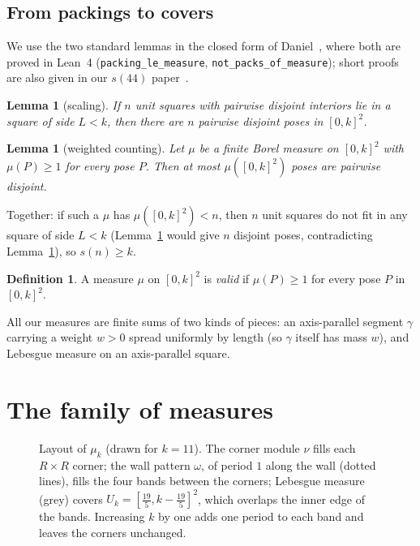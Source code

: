 \documentclass[11pt]{amsart}
\newtheorem{lemma}[theorem]{Lemma}
\theoremstyle{definition}
\newtheorem{definition}[theorem]{Definition}
\theoremstyle{remark}
\begin{document}
\subsection*{From packings to covers}
We use the two standard lemmas in the closed form of Daniel~\cite{daniel}, where both are proved in Lean~4
(\texttt{packing\_le\_measure}, \texttt{not\_packs\_of\_measure}); short proofs are also given in our $s(44)$
paper~\cite{s44}.

\begin{lemma}[scaling]\label{lem:scale}
If $n$ unit squares with pairwise disjoint interiors lie in a square of side $L<k$, then there are $n$ pairwise
disjoint poses in $[0,k]^2$.
\end{lemma}

\begin{lemma}[weighted counting]\label{lem:count}
Let $\mu$ be a finite Borel measure on $[0,k]^2$ with $\mu(P)\ge1$ for every pose $P$. Then at most $\mu([0,k]^2)$
poses are pairwise disjoint.
\end{lemma}

\noindent Together: if such a $\mu$ has $\mu([0,k]^2)<n$, then $n$ unit squares do not fit in any square of side
$L<k$ (Lemma~\ref{lem:scale} would give $n$ disjoint poses, contradicting Lemma~\ref{lem:count}), so $s(n)\ge k$.

\begin{definition}
A measure $\mu$ on $[0,k]^2$ is \emph{valid} if $\mu(P)\ge1$ for every pose $P$ in $[0,k]^2$.
\end{definition}

All our measures are finite sums of two kinds of pieces: an axis-parallel segment $\gamma$ carrying a weight
$w>0$ spread uniformly by length (so $\gamma$ itself has mass $w$), and Lebesgue measure on an axis-parallel square.

\section{The family of measures}\label{sec:family}

\begin{figure}[ht]
\centering
\caption{Layout of $\mu_k$ (drawn for $k=11$). The corner module $\nu$ fills each $R\times R$ corner; the wall
pattern $\omega$, of period $1$ along the wall (dotted lines), fills the four bands between the corners; Lebesgue
measure (grey) covers $U_k=[\frac{19}5,k-\frac{19}5]^2$, which overlaps the inner edge of the bands. Increasing $k$ by
one adds one period to each band and leaves the corners unchanged.}
\label{fig:family}
\end{figure}
\end{document}
